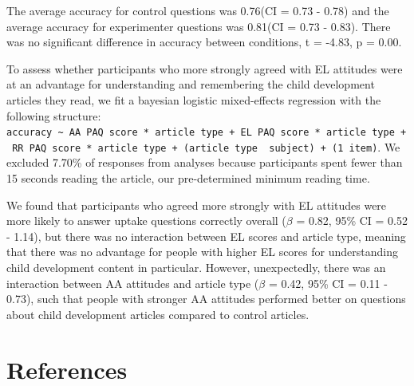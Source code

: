 \documentclass[man]{apa6}
\theoremstyle{definition}
\theoremstyle{definition}
\theoremstyle{definition}
\theoremstyle{remark}
\begin{document}
The average accuracy for control questions was 0.76(CI = 0.73 - 0.78)
and the average accuracy for experimenter questions was 0.81(CI = 0.73 -
0.83). There was no significant difference in accuracy between
conditions, t = -4.83, p = 0.00.

To assess whether participants who more strongly agreed with EL
attitudes were at an advantage for understanding and remembering the
child development articles they read, we fit a bayesian logistic
mixed-effects regression with the following structure:
\texttt{accuracy\ \textasciitilde{}\ AA\ PAQ\ score\ *\ article\ type\ +\ EL\ PAQ\ score\ *\ article\ type\ +\ RR\ PAQ\ score\ *\ article\ type\ +\ (article\ type\ \textbar{}\ subject)\ +\ (1\textbar{}\ item)}.
We excluded 7.70\% of responses from analyses because participants spent
fewer than 15 seconds reading the article, our pre-determined minimum
reading time.

We found that participants who agreed more strongly with EL attitudes
were more likely to answer uptake questions correctly overall (\(\beta\)
= 0.82, 95\% CI = 0.52 - 1.14), but there was no interaction between EL
scores and article type, meaning that there was no advantage for people
with higher EL scores for understanding child development content in
particular. However, unexpectedly, there was an interaction between AA
attitudes and article type (\(\beta\) = 0.42, 95\% CI = 0.11 - 0.73),
such that people with stronger AA attitudes performed better on
questions about child development articles compared to control articles.

\newpage

\section{References}\label{references}

\begingroup
\setlength{\parindent}{-0.5in} \setlength{\leftskip}{0.5in}

\hypertarget{refs}{}

\endgroup
\end{document}
